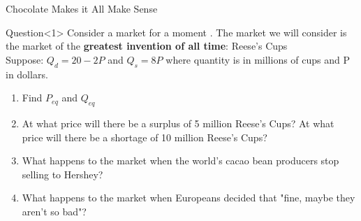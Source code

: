 \documentclass[aspectratio=169]{beamer}
\begin{document}
\begin{frame}{Chocolate Makes it All Make Sense}
    \begin{block}{Question}<1>
        Consider a market for a moment . The market we will consider is the market of the \textbf{greatest invention of all time}: Reese's Cups
        \vspace{2mm}
        \\Suppose:
        $Q_d = 20 - 2P$ and $Q_s =  8P$ where quantity is in millions of cups and P in dollars.
        \begin{enumerate}
            \item Find $P_{eq}$ and $Q_{eq}$
            \item At what price will there be a surplus of 5 million Reese's Cups?  At what price will there be a shortage of 10 million Reese's Cups?
            \item What happens to the market when the world's cacao bean producers stop selling to Hershey?
            \item What happens to the market when Europeans decided that "fine, maybe they aren't so bad"?
        \end{enumerate}
    \end{block}
    
\end{frame}
    
\end{document}
